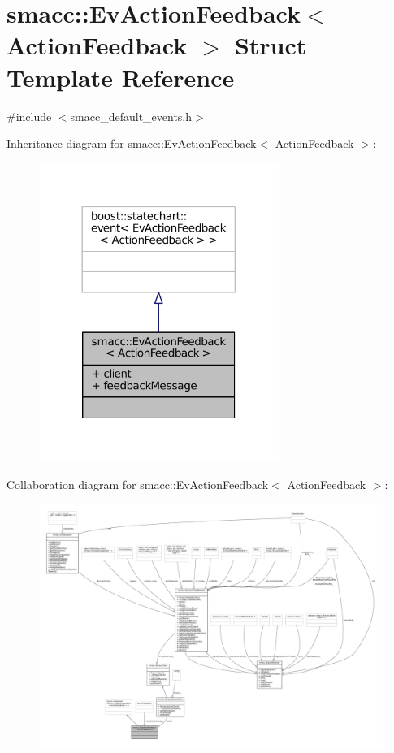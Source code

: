 \hypertarget{structsmacc_1_1EvActionFeedback}{}\section{smacc\+:\+:Ev\+Action\+Feedback$<$ Action\+Feedback $>$ Struct Template Reference}
\label{structsmacc_1_1EvActionFeedback}


{\ttfamily \#include $<$smacc\+\_\+default\+\_\+events.\+h$>$}



Inheritance diagram for smacc\+:\+:Ev\+Action\+Feedback$<$ Action\+Feedback $>$\+:
\nopagebreak
\begin{figure}[H]
\begin{center}
\leavevmode
\includegraphics[width=221pt]{structsmacc_1_1EvActionFeedback__inherit__graph}
\end{center}
\end{figure}


Collaboration diagram for smacc\+:\+:Ev\+Action\+Feedback$<$ Action\+Feedback $>$\+:
\nopagebreak
\begin{figure}[H]
\begin{center}
\leavevmode
\includegraphics[width=350pt]{structsmacc_1_1EvActionFeedback__coll__graph}
\end{center}
\end{figure}
